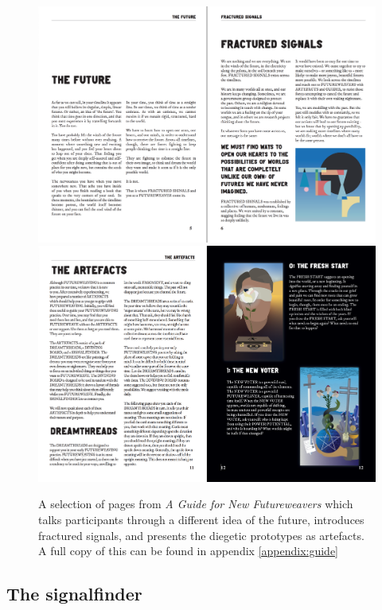 \begin{figure}
    \centering
    \includegraphics[width=0.9\linewidth]{Images/8/guide-1.png}
    \includegraphics[width=0.9\linewidth]{Images/8/guide-2.png}
    \caption{A selection of pages from \textit{A Guide for New Futureweavers} which talks participants through a different idea of the future, introduces fractured signals, and presents the diegetic prototypes as artefacts. A full copy of this can be found in appendix \ref{appendix:guide}}
    \label{fig:guide}
\end{figure}


\subsection{The signalfinder}


